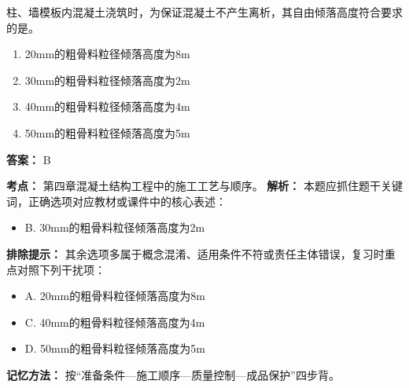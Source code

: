\documentclass[UTF8,fontset=fandol,11pt]{ctexart}
\begin{document}
\vspace{0.2em}

\begin{quizbox}[title={第 73 题}]
柱、墙模板内混凝土浇筑时，为保证混凝土不产生离析，其自由倾落高度符合要求的是。\\
\begin{enumerate}[label=\Alph*.]
\item 20mm的粗骨料粒径倾落高度为8m
\item 30mm的粗骨料粒径倾落高度为2m
\item 40mm的粗骨料粒径倾落高度为4m
\item 50mm的粗骨料粒径倾落高度为5m
\end{enumerate}
\textbf{答案：} B
\vspace{0.25em}
\begin{answerbox}[title={考点解析}]
\textbf{考点：} 第四章混凝土结构工程中的施工工艺与顺序。
\textbf{解析：} 本题应抓住题干关键词，正确选项对应教材或课件中的核心表述：
\begin{itemize}
\item B. 30mm的粗骨料粒径倾落高度为2m
\end{itemize}
\textbf{排除提示：} 其余选项多属于概念混淆、适用条件不符或责任主体错误，复习时重点对照下列干扰项：
\begin{itemize}
\item A. 20mm的粗骨料粒径倾落高度为8m
\item C. 40mm的粗骨料粒径倾落高度为4m
\item D. 50mm的粗骨料粒径倾落高度为5m
\end{itemize}
\textbf{记忆方法：} 按“准备条件—施工顺序—质量控制—成品保护”四步背。
\end{answerbox}
\end{quizbox}

\vspace{0.2em}
\end{document}
